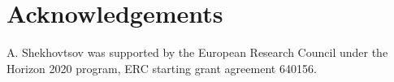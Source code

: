 \documentclass[runningheads]{llncs}
\begin{document}





% 




\section*{Acknowledgements}
A. Shekhovtsov was supported by the European Research Council under the Horizon 2020 program, ERC starting grant agreement 640156.

{\small
%
%
%


}

\newpage
\appendix
% 


% 

\end{document}
